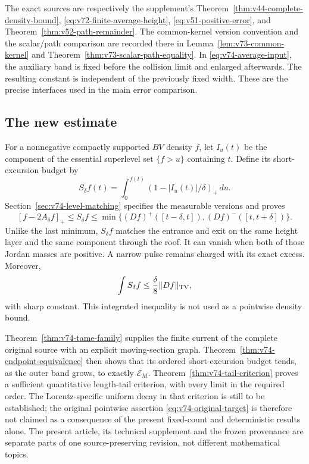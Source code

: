 \documentclass[11pt,reqno]{amsart}
\numberwithin{equation}{section}
\theoremstyle{definition}\newtheorem{definition}[theorem]{Definition}
\theoremstyle{remark}\newtheorem{remark}[theorem]{Remark}
\theoremstyle{definition}\newtheorem{inputstatement}[theorem]{Input statement}
\begin{document}
The exact sources are respectively the supplement's
Theorem~\ref{thm:v44-complete-density-bound},
\eqref{eq:v72-finite-average-height},
\eqref{eq:v51-positive-error}, and
Theorem~\ref{thm:v52-path-remainder}. The common-kernel version
convention and the scalar/path comparison are recorded there in
Lemma~\ref{lem:v73-common-kernel} and
Theorem~\ref{thm:v73-scalar-path-equality}.
In \eqref{eq:v74-average-input}, the auxiliary band is fixed before
the collision limit and enlarged afterwards. The resulting constant
is independent of the previously fixed width. These are the precise
interfaces used in the main error comparison.

\subsection{The new estimate}
For a nonnegative compactly supported $BV$ density $f$, let $I_u(t)$
be the component of the essential superlevel set $\{f>u\}$ containing
$t$. Define its short-excursion budget by
\[
 S_\delta f(t)=\int_0^{f(t)}(1-|I_u(t)|/\delta)_+\,du.
\]
Section~\ref{sec:v74-level-matching} specifies the measurable versions
and proves
\begin{equation}\label{eq:v74-leading-estimate}
 [f-2A_\delta f]_+\le S_\delta f
 \le\min\{(Df)^+([t-\delta,t]),(Df)^-([t,t+\delta])\}.
\end{equation}
Unlike the last minimum, $S_\delta f$ matches the entrance and exit
on the same height layer and the same component through the roof.
It can vanish when both of those Jordan masses are positive.
A narrow pulse remains charged with its exact excess.
Moreover,
\[
 \int S_\delta f\le\frac\delta8\|Df\|_{\operatorname{TV}},
\]
with sharp constant. This integrated inequality is not used as a
pointwise density bound.

Theorem~\ref{thm:v74-tame-family} supplies the finite current of the
complete original source with an explicit moving-section graph.
Theorem~\ref{thm:v74-endpoint-equivalence} then shows that its
ordered short-excursion budget tends, as the outer band grows, to
exactly $\mathcal E_M$. Theorem~\ref{thm:v74-tail-criterion} proves
a sufficient quantitative length-tail criterion, with every limit
in the required order. The Lorentz-specific uniform decay in that
criterion is still to be established; the original pointwise
assertion \eqref{eq:v74-original-target} is therefore not claimed
as a consequence of the present fixed-count and deterministic
results alone. The present article, its technical supplement and
the frozen provenance are separate parts of one source-preserving
revision, not different mathematical topics.
\end{document}
